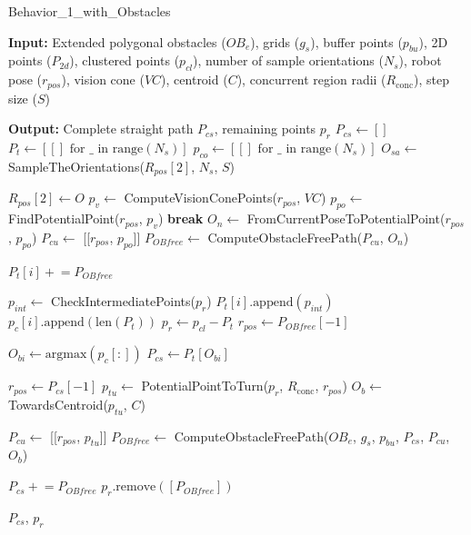 \begin{algorithm}[H]
    \caption{Behavior\_1\_with\_Obstacles}
    \label{alg:behavioral1_obs}
    \begin{algorithmic}[1]

    \Statex \textbf{Input:} Extended polygonal obstacles ($OB_e$), grids ($g_s$), buffer points ($p_{bu}$), 2D points ($P_{2d}$), clustered points ($p_{cl}$), number of sample orientations ($N_s$), robot pose ($r_{pos}$), vision cone ($VC$), centroid ($C$), concurrent region radii ($R_{\text{conc}}$), step size ($S$)

    \Statex \textbf{Output:} Complete straight path $P_{cs}$, remaining points $p_r$
    \newline
    \State $P_{cs} \leftarrow []$
    \State $P_t \leftarrow [[] \text{ for } \_ \text{ in range}(N_s)]$
    \State $p_{co} \leftarrow [[] \text{ for } \_ \text{ in range}(N_s)]$
    \State $O_{sa} \leftarrow$ SampleTheOrientations($R_{pos}[2]$, $N_s$, $S$)
    
        \State $R_{pos}[2] \leftarrow O$
            \State $p_v \leftarrow$ ComputeVisionConePoints($r_{pos}$, $VC$)
            \State $p_{po} \leftarrow$ FindPotentialPoint($r_{pos}$, $p_v$)
                \State \textbf{break}
            \EndIf
            \State $O_n \leftarrow$ FromCurrentPoseToPotentialPoint($r_{pos}$, $p_{po}$)
            \State $P_{cu} \leftarrow$ [[$r_{pos}$, $p_{po}$]]
            \State $P_{OB free} \leftarrow$ ComputeObstacleFreePath($P_{cu}$, $O_n$)


            \State $P_t[i] \mathrel{+}= P_{OB free}$
            
            \State $p_{int} \leftarrow$ CheckIntermediatePoints($p_r$)
            \State $P_t[i].\text{append}(p_{int})$
            \State $p_c[i].\text{append}(\text{len}(P_t))$
            \State $p_r \leftarrow p_{cl} - P_t$
            \State $r_{pos} \leftarrow P_{OB free}[-1]$
        \EndWhile
    \EndFor
    
    \State $O_{bi} \leftarrow \text{argmax}(p_c[:])$
    \State $P_{cs} \leftarrow P_t[O_{bi}]$
    
    \State $r_{pos} \leftarrow P_{cs}[-1]$
    \State $p_{tu} \leftarrow$ PotentialPointToTurn($p_r$, $R_{\text{conc}}$, $r_{pos}$)
    \State $O_b \leftarrow$ TowardsCentroid($p_{tu}$, $C$)

    \State $P_{cu} \leftarrow$ [[$r_{pos}$, $p_{tu}$]]
    \State $P_{OB free} \leftarrow$ ComputeObstacleFreePath($OB_e$, $g_s$, $p_{bu}$, $P_{cs}$, $P_{cu}$, $O_b$)

    \State $P_{cs} \mathrel{+}= P_{OB free}$
    \State $p_r.\text{remove}([P_{OB free}])$ 
    
    \State \Return $P_{cs}$, $p_r$
    \end{algorithmic}
    \end{algorithm}




